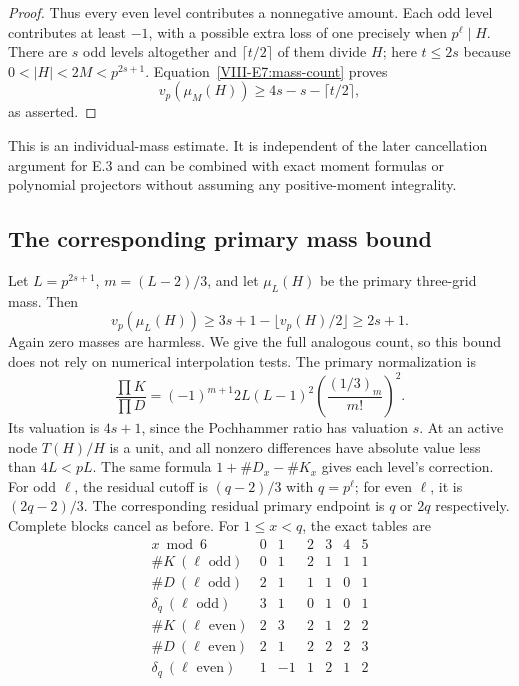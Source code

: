 \documentclass[11pt,letterpaper]{article}
\numberwithin{equation}{section}
\begin{document}
\begin{proof}
Thus every even level contributes a nonnegative amount. Each odd
level contributes at least $-1$, with a possible extra loss of one
precisely when $p^\ell\mid H$. There are $s$ odd levels altogether
and $\lceil t/2\rceil$ of them divide $H$; here $t\le2s$ because
$0<|H|<2M<p^{2s+1}$. Equation~\eqref{VIII-E7:mass-count} proves
\[
 v_p(\mu_M(H))\ge4s-s-\lceil t/2\rceil,
\]
as asserted.
\end{proof}

This is an individual-mass estimate. It is independent of the later
cancellation argument for E.3 and can be combined with exact moment formulas or
polynomial projectors without assuming any positive-moment integrality.

\subsection{The corresponding primary mass bound}
Let $L=p^{2s+1}$, $m=(L-2)/3$, and let $\mu_L(H)$ be the primary
three-grid mass. Then
\begin{equation}\label{VIII-E7:primary-mass-bound}
 \boxed{v_p(\mu_L(H))\ge3s+1-\lfloor v_p(H)/2\rfloor\ge2s+1.}
\end{equation}
Again zero masses are harmless. We give the full analogous count,
so this bound does not rely on numerical interpolation tests.
The primary normalization is
\[
 \frac{\prod K}{\prod D}
 =(-1)^{m+1}2L(L-1)^2\left(\frac{(1/3)_m}{m!}\right)^2.
\]
Its valuation is $4s+1$, since the Pochhammer ratio has valuation $s$.
At an active node $T(H)/H$ is a unit, and all nonzero differences
have absolute value less than $4L<pL$.
The same formula $1+\#D_x-\#K_x$ gives each level's correction.
For odd $\ell$, the residual cutoff is $(q-2)/3$ with $q=p^\ell$;
for even $\ell$, it is $(2q-2)/3$. The corresponding residual primary
endpoint is $q$ or $2q$ respectively. Complete blocks cancel as before.
For $1\le x<q$, the exact tables are
\[
\begin{array}{c|rrrrrr}
x\bmod6&0&1&2&3&4&5\\\hline
\#K\ (\ell\text{ odd})&0&1&2&1&1&1\\
\#D\ (\ell\text{ odd})&2&1&1&1&0&1\\
\delta_q\ (\ell\text{ odd})&3&1&0&1&0&1\\\hline
\#K\ (\ell\text{ even})&2&3&2&1&2&2\\
\#D\ (\ell\text{ even})&2&1&2&2&2&3\\
\delta_q\ (\ell\text{ even})&1&-1&1&2&1&2
\end{array}
\]
\end{document}
